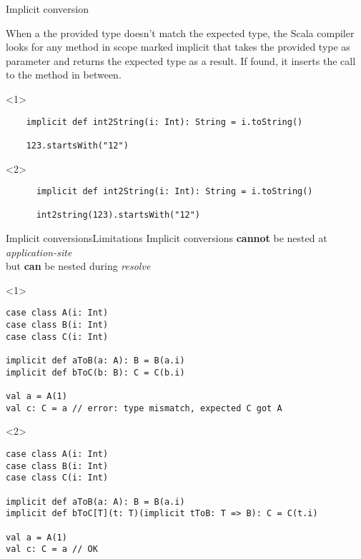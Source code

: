 \documentclass[aspectratio=169]{beamer}
\begin{document}
\begin{frame}[fragile]{Implicit conversion}
  \begin{block}{}
    When a the provided type doesn't match the expected type, the Scala compiler looks for any
    method in scope marked implicit that takes the provided type as parameter and returns the
    expected type as a result. If found, it inserts the call to the method in between.
  \end{block}
  \bigskip
  \begin{onlyenv}<1>
   \begin{verbatim}
    implicit def int2String(i: Int): String = i.toString()

    123.startsWith("12")
   \end{verbatim} 
  \end{onlyenv}
  \begin{onlyenv}<2>
     \begin{verbatim}
      implicit def int2String(i: Int): String = i.toString()

      int2string(123).startsWith("12")
     \end{verbatim} 
    \end{onlyenv}
\end{frame}

\begin{frame}[fragile]{Implicit conversions}{Limitations}
Implicit conversions \textbf{cannot} be nested at \textit{application-site}\\ but \textbf{can}
be nested during \textit{resolve}
\medskip
\begin{onlyenv}<1>
\begin{verbatim}
case class A(i: Int)
case class B(i: Int)
case class C(i: Int)

implicit def aToB(a: A): B = B(a.i)
implicit def bToC(b: B): C = C(b.i)

val a = A(1)
val c: C = a // error: type mismatch, expected C got A
\end{verbatim} 
\end{onlyenv}
\begin{onlyenv}<2>
\begin{verbatim}
case class A(i: Int)
case class B(i: Int)
case class C(i: Int)

implicit def aToB(a: A): B = B(a.i)
implicit def bToC[T](t: T)(implicit tToB: T => B): C = C(t.i)

val a = A(1)
val c: C = a // OK
\end{verbatim}
\end{onlyenv}
\end{frame}
\end{document}
